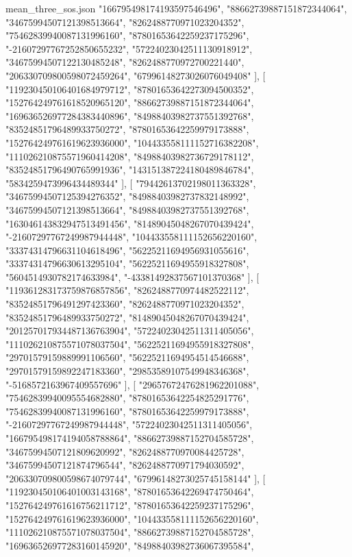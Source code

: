 \begin{filecontents*}[overwrite]{mean_three_sos.json}
    "166795498174193597546496",
    "88662739887151872344064",
    "34675994507121398513664",
    "8262488770971023204352",
    "75462839940087131996160",
    "87801653642259237175296",
    "-21607297767252850655232",
    "57224023042511130918912",
    "34675994507122130485248",
    "8262488770972700221440",
    "206330709800598072459264",
    "67996148273026076049408"
   ],
   [
    "119230450106401684979712",
    "87801653642273094500352",
    "152764249761618520965120",
    "88662739887151872344064",
    "169636526977284383440896",
    "84988403982737551392768",
    "83524851796489933750272",
    "87801653642259979173888",
    "152764249761619623936000",
    "104433558111152716382208",
    "111026210875571960414208",
    "84988403982736729178112",
    "83524851796490765991936",
    "143151387224180489846784",
    "5834259473996434489344"
   ],
   [
    "79442613702198011363328",
    "34675994507125394276352",
    "84988403982737832148992",
    "34675994507121398513664",
    "84988403982737551392768",
    "163046143832947513491456",
    "81489045048267070439424",
    "-21607297767249987944448",
    "104433558111152656220160",
    "33374314796631104618496",
    "56225211694956931055616",
    "33374314796630613295104",
    "56225211694955918327808",
    "5604514930782174633984",
    "-43381492837567101370368"
   ],
   [
    "119361283173759876857856",
    "8262488770974482522112",
    "83524851796491297423360",
    "8262488770971023204352",
    "83524851796489933750272",
    "81489045048267070439424",
    "201257017934487136763904",
    "57224023042511311405056",
    "111026210875571078037504",
    "56225211694955918327808",
    "29701579159889991106560",
    "56225211694954514546688",
    "29701579159892247183360",
    "29853589107549948346368",
    "-5168572163967409557696"
   ],
   [
    "29657672476281962201088",
    "75462839940095554682880",
    "87801653642254825291776",
    "75462839940087131996160",
    "87801653642259979173888",
    "-21607297767249987944448",
    "57224023042511311405056",
    "166795498174194058788864",
    "88662739887152704585728",
    "34675994507121809620992",
    "8262488770970084425728",
    "34675994507121874796544",
    "8262488770971794030592",
    "206330709800598674079744",
    "67996148273025745158144"
   ],
   [
    "119230450106401003143168",
    "87801653642269474750464",
    "152764249761616756211712",
    "87801653642259237175296",
    "152764249761619623936000",
    "104433558111152656220160",
    "111026210875571078037504",
    "88662739887152704585728",
    "169636526977283160145920",
    "84988403982736067395584",

\end{filecontents*}
